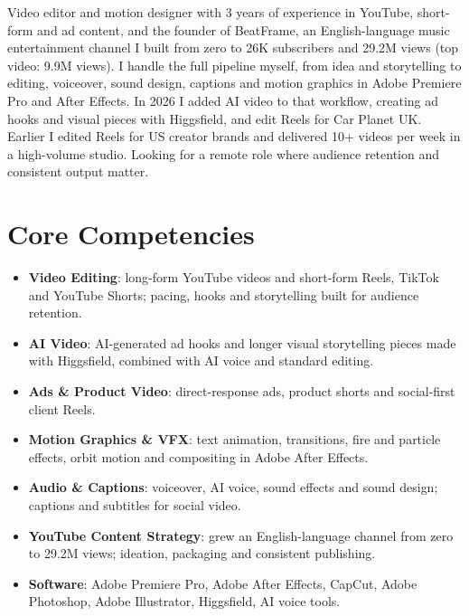 \documentclass[11pt,a4paper,sans]{moderncv}
\begin{document}
\makecvtitle


\vspace{6pt}
\small{Video editor and motion designer with 3 years of experience in YouTube, short-form and ad content, and the founder of BeatFrame, an English-language music entertainment channel I built from zero to 26K subscribers and 29.2M views (top video: 9.9M views). I handle the full pipeline myself, from idea and storytelling to editing, voiceover, sound design, captions and motion graphics in Adobe Premiere Pro and After Effects. In 2026 I added AI video to that workflow, creating ad hooks and visual pieces with Higgsfield, and edit Reels for Car Planet UK. Earlier I edited Reels for US creator brands and delivered 10+ videos per week in a high-volume studio. Looking for a remote role where audience retention and consistent output matter.}


\section{Core Competencies}
\vspace{1pt}
\begin{itemize}
\item \textbf{Video Editing}: long-form YouTube videos and short-form Reels, TikTok and YouTube Shorts; pacing, hooks and storytelling built for audience retention.
\item \textbf{AI Video}: AI-generated ad hooks and longer visual storytelling pieces made with Higgsfield, combined with AI voice and standard editing.
\item \textbf{Ads \& Product Video}: direct-response ads, product shorts and social-first client Reels.
\item \textbf{Motion Graphics \& VFX}: text animation, transitions, fire and particle effects, orbit motion and compositing in Adobe After Effects.
\item \textbf{Audio \& Captions}: voiceover, AI voice, sound effects and sound design; captions and subtitles for social video.
\item \textbf{YouTube Content Strategy}: grew an English-language channel from zero to 29.2M views; ideation, packaging and consistent publishing.
\item \textbf{Software}: Adobe Premiere Pro, Adobe After Effects, CapCut, Adobe Photoshop, Adobe Illustrator, Higgsfield, AI voice tools.
\end{itemize}
\end{document}

